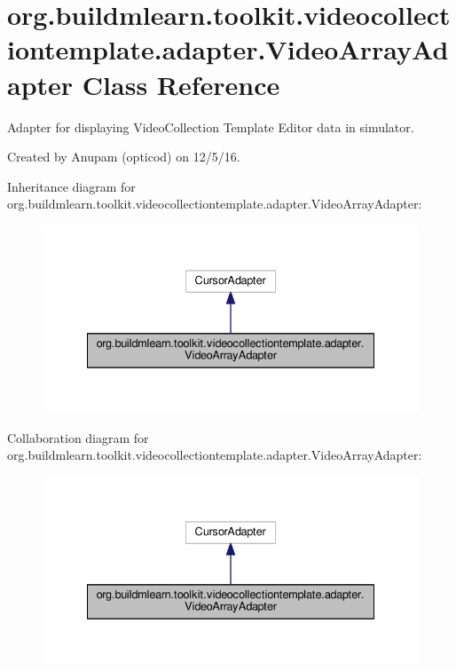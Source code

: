 \hypertarget{classorg_1_1buildmlearn_1_1toolkit_1_1videocollectiontemplate_1_1adapter_1_1VideoArrayAdapter}{}\section{org.\+buildmlearn.\+toolkit.\+videocollectiontemplate.\+adapter.\+Video\+Array\+Adapter Class Reference}
\label{classorg_1_1buildmlearn_1_1toolkit_1_1videocollectiontemplate_1_1adapter_1_1VideoArrayAdapter}


Adapter for displaying Video\+Collection Template Editor data in simulator. 

Created by Anupam (opticod) on 12/5/16.  




Inheritance diagram for org.\+buildmlearn.\+toolkit.\+videocollectiontemplate.\+adapter.\+Video\+Array\+Adapter\+:
\nopagebreak
\begin{figure}[H]
\begin{center}
\leavevmode
\includegraphics[width=335pt]{classorg_1_1buildmlearn_1_1toolkit_1_1videocollectiontemplate_1_1adapter_1_1VideoArrayAdapter__inherit__graph}
\end{center}
\end{figure}


Collaboration diagram for org.\+buildmlearn.\+toolkit.\+videocollectiontemplate.\+adapter.\+Video\+Array\+Adapter\+:
\nopagebreak
\begin{figure}[H]
\begin{center}
\leavevmode
\includegraphics[width=335pt]{classorg_1_1buildmlearn_1_1toolkit_1_1videocollectiontemplate_1_1adapter_1_1VideoArrayAdapter__coll__graph}
\end{center}
\end{figure}
